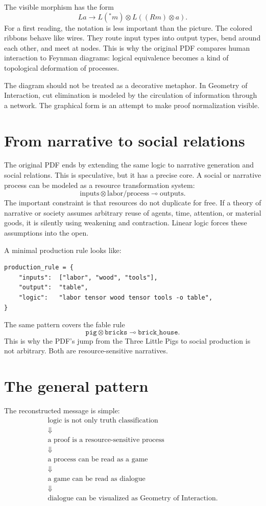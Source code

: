 The visible morphism has the form
\[
  L a \longrightarrow L({}^\ast m)\otimes L((R m)\otimes a).
\]
For a first reading, the notation is less important than the picture.  The colored ribbons behave like wires.  They route input types into output types, bend around each other, and meet at nodes.  This is why the original PDF compares human interaction to Feynman diagrams: logical equivalence becomes a kind of topological deformation of processes.

\begin{remark}
The diagram should not be treated as a decorative metaphor.  In Geometry of Interaction, cut elimination is modeled by the circulation of information through a network.  The graphical form is an attempt to make proof normalization visible.
\end{remark}

\section{From narrative to social relations}

The original PDF ends by extending the same logic to narrative generation and social relations.  This is speculative, but it has a precise core.  A social or narrative process can be modeled as a resource transformation system:
\[
  \text{inputs} \otimes \text{labor/process}
  \multimap
  \text{outputs}.
\]
The important constraint is that resources do not duplicate for free.  If a theory of narrative or society assumes arbitrary reuse of agents, time, attention, or material goods, it is silently using weakening and contraction.  Linear logic forces these assumptions into the open.

A minimal production rule looks like:
\begin{verbatim}
production_rule = {
    "inputs":  ["labor", "wood", "tools"],
    "output":  "table",
    "logic":   "labor tensor wood tensor tools -o table",
}
\end{verbatim}
The same pattern covers the fable rule
\[
  \texttt{pig}\otimes\texttt{bricks}\multimap\texttt{brick\_house}.
\]
This is why the PDF's jump from the Three Little Pigs to social production is not arbitrary.  Both are resource-sensitive narratives.

\section{The general pattern}

The reconstructed message is simple:
\[
\begin{array}{c}
\text{logic is not only truth classification}\\
\Downarrow\\
\text{a proof is a resource-sensitive process}\\
\Downarrow\\
\text{a process can be read as a game}\\
\Downarrow\\
\text{a game can be read as dialogue}\\
\Downarrow\\
\text{dialogue can be visualized as Geometry of Interaction.}
\end{array}
\]

